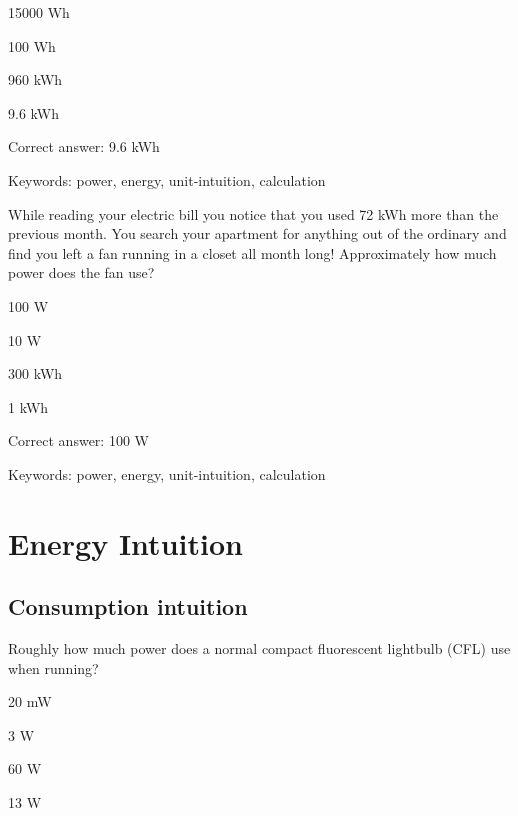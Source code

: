 \begin{answer}
	\item 15000 Wh
	\item 100 Wh
	\item 960 kWh
	\item 9.6 kWh
\end{answer}

Correct answer: 9.6 kWh

Keywords: power, energy, unit-intuition, calculation

\begin{question}
	\item While reading your electric bill you notice that you used 72 kWh more than the previous month. You search your apartment for anything out of the ordinary and find you left a fan running in a closet all month long! Approximately how much power does the fan use?
\end{question}

\begin{answer}
	\item 100 W
	\item 10 W
	\item 300 kWh
	\item 1 kWh
\end{answer}

Correct answer: 100 W

Keywords: power, energy, unit-intuition, calculation


\section{Energy Intuition}


\subsection{Consumption intuition}

\begin{question}
	\item Roughly how much power does a normal compact fluorescent lightbulb (CFL) use when running?
\end{question}

\begin{answer}
	\item 20 mW
	\item 3 W
	\item 60 W
	\item 13 W
\end{answer}

